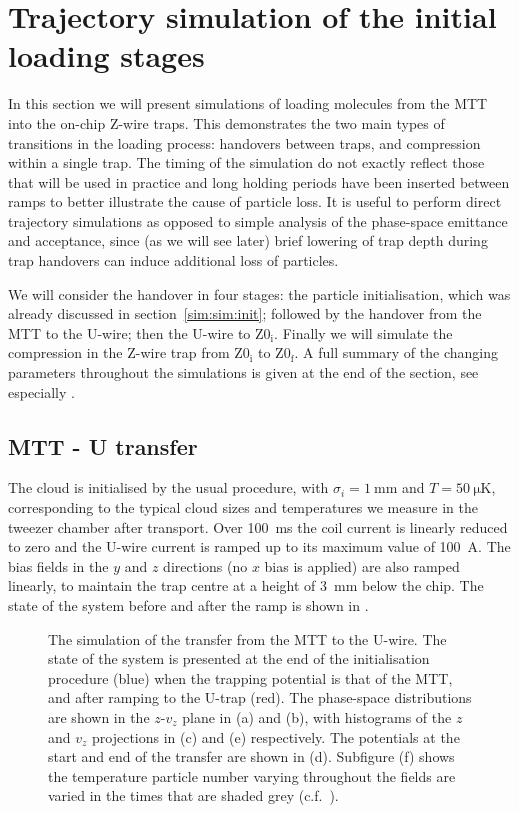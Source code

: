 \section{Trajectory simulation of the initial loading stages}

In this section we will present simulations of loading molecules from the MTT
into the on-chip Z-wire traps. 
This demonstrates
the two main types of transitions in the loading process: handovers between
traps, and compression within a single trap. The timing of the simulation do
not exactly reflect those that will be used in practice and long holding periods
have been inserted between ramps to better illustrate the cause of particle
loss. It is useful to perform direct trajectory simulations as opposed to
simple analysis of the phase-space emittance and acceptance, since (as we will
see later) brief lowering of trap depth during trap handovers can induce
additional loss of particles.

We will consider the handover in four stages: the particle initialisation, which
was already discussed in section~\ref{sim:sim:init}; followed by the
handover from the MTT to the U-wire; then the U-wire to $\mathrm{Z0_i}$.
Finally we will simulate the compression in the Z-wire trap from
$\mathrm{Z0_i}$ to $\mathrm{Z0_f}$. A full summary of the changing parameters
throughout the simulations is given at the end of the section, see especially
.

\subsection{MTT - U transfer}
\label{sim:sim:trans_U}

The cloud is initialised by the usual procedure, with $\sigma_i =
\SI{1}{\milli\meter}$ and $T=\SI{50}{\micro\kelvin}$, corresponding to the
typical cloud sizes and temperatures we measure in the tweezer chamber after
transport. Over \SI{100}{\milli\second} the coil current is linearly
reduced to zero and the U-wire current is ramped up to its maximum value of
\SI{100}{\ampere}. The bias fields in the $y$ and $z$ directions (no $x$ bias
is applied) are also ramped linearly, to maintain the trap centre at a height
of \SI{3}{\milli\meter} below the chip. The state of the system before and
after the ramp is shown in .

\begin{figure}[p]
\centering
  \caption{
    The simulation of the transfer from the MTT to the U-wire. The state of the
    system is presented at the end of the initialisation procedure (blue) when
    the trapping potential is that of the MTT, and after ramping to the U-trap
    (red). The phase-space distributions are shown in the $z$-$v_z$ plane in
    (a) and (b), with histograms of the $z$ and $v_z$ projections in (c) and
    (e) respectively. The potentials at the start and end of the transfer are
    shown in (d). Subfigure (f) shows the temperature particle number varying
    throughout the fields are varied in the times that are shaded grey
    (c.f.~).
  }
  \label{sim:fig:mttusim}
\end{figure}

